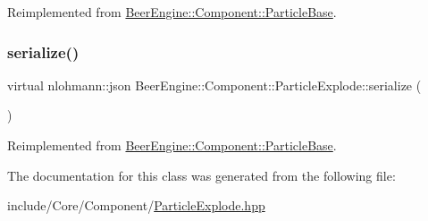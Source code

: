 Reimplemented from \mbox{\hyperlink{class_beer_engine_1_1_component_1_1_particle_base_a8d42fe68ec7c27aed419cde949ac278a}{Beer\+Engine\+::\+Component\+::\+Particle\+Base}}.

\mbox{\label{class_beer_engine_1_1_component_1_1_particle_explode_a194d098568efe69f8e8b62eec5863ae6}} 
\subsubsection{\texorpdfstring{serialize()}{serialize()}}
{\footnotesize\ttfamily virtual nlohmann\+::json Beer\+Engine\+::\+Component\+::\+Particle\+Explode\+::serialize (\begin{DoxyParamCaption}{ }\end{DoxyParamCaption})\hspace{0.3cm}{\ttfamily [virtual]}}



Reimplemented from \mbox{\hyperlink{class_beer_engine_1_1_component_1_1_particle_base_ac4ab484a5ef468cbb69cccdf39e6d9a8}{Beer\+Engine\+::\+Component\+::\+Particle\+Base}}.



The documentation for this class was generated from the following file\+:\begin{DoxyCompactItemize}
\item 
include/\+Core/\+Component/\mbox{\hyperlink{_particle_explode_8hpp}{Particle\+Explode.\+hpp}}\end{DoxyCompactItemize}
